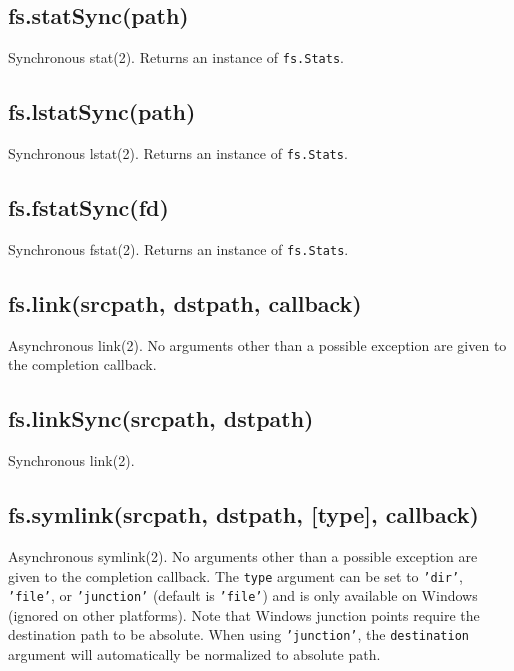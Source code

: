 \subsection{fs.statSync(path)}\label{fs.statsyncpath}

Synchronous stat(2). Returns an instance of \texttt{fs.Stats}.

\subsection{fs.lstatSync(path)}\label{fs.lstatsyncpath}

Synchronous lstat(2). Returns an instance of \texttt{fs.Stats}.

\subsection{fs.fstatSync(fd)}\label{fs.fstatsyncfd}

Synchronous fstat(2). Returns an instance of \texttt{fs.Stats}.

\subsection{fs.link(srcpath, dstpath,
callback)}\label{fs.linksrcpath-dstpath-callback}

Asynchronous link(2). No arguments other than a possible exception are
given to the completion callback.

\subsection{fs.linkSync(srcpath,
dstpath)}\label{fs.linksyncsrcpath-dstpath}

Synchronous link(2).

\subsection{fs.symlink(srcpath, dstpath, {[}type{]},
callback)}\label{fs.symlinksrcpath-dstpath-type-callback}

Asynchronous symlink(2). No arguments other than a possible exception
are given to the completion callback. The \texttt{type} argument can be
set to \texttt{'dir'}, \texttt{'file'}, or \texttt{'junction'} (default
is \texttt{'file'}) and is only available on Windows (ignored on other
platforms). Note that Windows junction points require the destination
path to be absolute. When using \texttt{'junction'}, the
\texttt{destination} argument will automatically be normalized to
absolute path.

